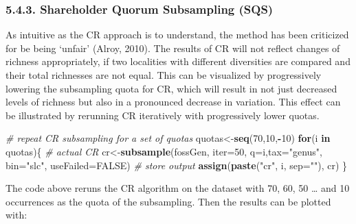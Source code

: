\documentclass[]{article}
\newenvironment{Shaded}{\begin{snugshade}}{\end{snugshade}}
\newcommand{\CommentTok}[1]{\textcolor[rgb]{0.56,0.35,0.01}{\textit{#1}}}
\newcommand{\ControlFlowTok}[1]{\textcolor[rgb]{0.13,0.29,0.53}{\textbf{#1}}}
\newcommand{\DataTypeTok}[1]{\textcolor[rgb]{0.13,0.29,0.53}{#1}}
\newcommand{\DecValTok}[1]{\textcolor[rgb]{0.00,0.00,0.81}{#1}}
\newcommand{\KeywordTok}[1]{\textcolor[rgb]{0.13,0.29,0.53}{\textbf{#1}}}
\newcommand{\NormalTok}[1]{#1}
\newcommand{\OperatorTok}[1]{\textcolor[rgb]{0.81,0.36,0.00}{\textbf{#1}}}
\newcommand{\OtherTok}[1]{\textcolor[rgb]{0.56,0.35,0.01}{#1}}
\newcommand{\StringTok}[1]{\textcolor[rgb]{0.31,0.60,0.02}{#1}}
\begin{document}
\hypertarget{shareholder-quorum-subsampling-sqs}{%
\subsubsection{5.4.3. Shareholder Quorum Subsampling
(SQS)}\label{shareholder-quorum-subsampling-sqs}}

As intuitive as the CR approach is to understand, the method has been
criticized for be being `unfair' (Alroy, 2010). The results of CR will
not reflect changes of richness appropriately, if two localities with
different diversities are compared and their total richnesses are not
equal. This can be visualized by progressively lowering the subsampling
quota for CR, which will result in not just decreased levels of richness
but also in a pronounced decrease in variation. This effect can be
illustrated by rerunning CR iteratively with progressively lower quotas.

\begin{Shaded}
\begin{Highlighting}[]
\CommentTok{# repeat CR subsampling for a set of quotas}
\NormalTok{quotas<-}\KeywordTok{seq}\NormalTok{(}\DecValTok{70}\NormalTok{,}\DecValTok{10}\NormalTok{,}\OperatorTok{-}\DecValTok{10}\NormalTok{)}
\ControlFlowTok{for}\NormalTok{(i }\ControlFlowTok{in}\NormalTok{ quotas)\{}
   \CommentTok{# actual CR }
\NormalTok{   cr<-}\KeywordTok{subsample}\NormalTok{(fossGen, }\DataTypeTok{iter=}\DecValTok{50}\NormalTok{, }\DataTypeTok{q=}\NormalTok{i,}\DataTypeTok{tax=}\StringTok{"genus"}\NormalTok{, }\DataTypeTok{bin=}\StringTok{"slc"}\NormalTok{, }
    \DataTypeTok{useFailed=}\OtherTok{FALSE}\NormalTok{)}
  \CommentTok{# store output}
  \KeywordTok{assign}\NormalTok{(}\KeywordTok{paste}\NormalTok{(}\StringTok{"cr"}\NormalTok{, i, }\DataTypeTok{sep=}\StringTok{""}\NormalTok{), cr)}
\NormalTok{\}}
\end{Highlighting}
\end{Shaded}

The code above reruns the CR algorithm on the dataset with 70, 60, 50
\ldots{} and 10 occurrences as the quota of the subsampling. Then the
results can be plotted with:
\end{document}
